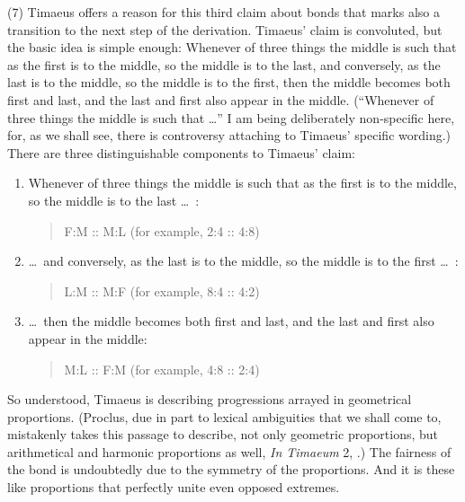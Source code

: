 (7) Timaeus offers a reason for this third claim about bonds that marks also a transition to the next step of the derivation. Timaeus' claim is convoluted, but the basic idea is simple enough: Whenever of three things the middle is such that as the first is to the middle, so the middle is to the last, and conversely, as the last is to the middle, so the middle is to the first, then the middle becomes both first and last, and the last and first also appear in the middle. (``Whenever of three things the middle is such that \ldots'' I am being deliberately non-specific here, for, as we shall see, there is controversy attaching to Timaeus' specific wording.) There are three distinguishable components to Timaeus' claim:
\begin{enumerate}[(1)]
	\item Whenever of three things the middle is such that as the first is to the middle, so the middle is to the last \ldots\ :
	\begin{quote}
		F:M :: M:L (for example, 2:4 :: 4:8)
	\end{quote}
	\item \ldots\ and conversely, as the last is to the middle, so the middle is to the first \dots\ :
	\begin{quote}
		L:M :: M:F (for example, 8:4 :: 4:2)
	\end{quote}
	\item \ldots\ then the middle becomes both first and last, and the last and first also appear in the middle:
	\begin{quote}
		M:L :: F:M (for example, 4:8 :: 2:4)
	\end{quote}
\end{enumerate}
So understood, Timaeus is describing progressions arrayed in geometrical proportions. (Proclus, due in part to lexical ambiguities that we shall come to, mistakenly takes this passage to describe, not only geometric proportions, but arithmetical and harmonic proportions as well, \emph{In Timaeum} 2, \citealt{Diehl:1903re}.) The fairness of the bond is undoubtedly due to the symmetry of the proportions. And it is these like proportions that perfectly unite even opposed extremes.  

